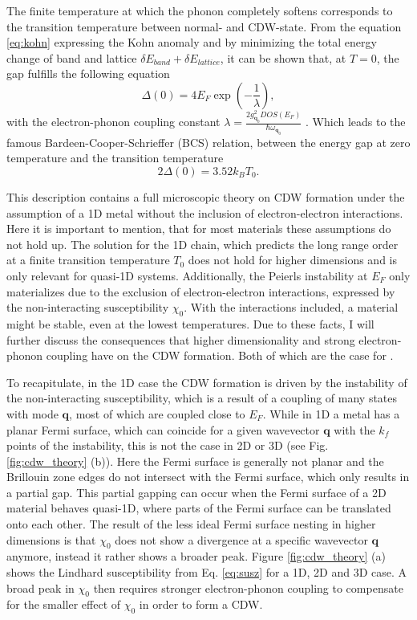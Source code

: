 The finite temperature at which the phonon completely softens corresponds to the transition temperature between normal- and CDW-state.
From the equation \ref{eq:kohn} expressing the Kohn anomaly and by minimizing the total energy change of band and lattice $\delta E_{band}+\delta E_{lattice}$, it can be shown that, at $T=0$, the gap fulfills the following equation
\begin{equation}
	\Delta(0)=4E_F\exp(-\frac{1}{\lambda}),
\end{equation}
with the electron-phonon coupling constant $\lambda=\frac{2g_{\mathbf{q}_0}^2DOS(E_F)}{\hbar\omega_{\mathbf{q}_0}}$ \cite{rice_theory_1973}. 
Which leads to the famous Bardeen-Cooper-Schrieffer (BCS) relation, between the energy gap at zero temperature and the transition temperature
\begin{equation}
	2\Delta(0)=3.52k_BT_0.
\end{equation}

This description contains a full microscopic theory on CDW formation under the assumption of a 1D metal without the inclusion of electron-electron interactions.
Here it is important to mention, that for most materials these assumptions do not hold up.
The solution for the 1D chain, which predicts the long range order at a finite transition temperature $T_0$ does not hold for higher dimensions and is only relevant for quasi-1D systems.
Additionally, the Peierls instability at $E_F$ only materializes due to the exclusion of electron-electron interactions, expressed by the non-interacting susceptibility $\chi_0$.
With the interactions included, a material might be stable, even at the lowest temperatures.
Due to these facts, I will further discuss the consequences that higher dimensionality and strong electron-phonon coupling have on the CDW formation.
Both of which are the case for .

To recapitulate, in the 1D case the CDW formation is driven by the instability of the non-interacting susceptibility, which is a result of a coupling of many states with mode $\mathbf{q}$, most of which are coupled close to $E_F$.
While in 1D a metal has a planar Fermi surface, which can coincide for a given wavevector $\mathbf{q}$ with the $k_f$ points of the instability, this is not the case in 2D or 3D (see Fig. \ref{fig:cdw_theory} (b)).
Here the Fermi surface is generally not planar and the Brillouin zone edges do not intersect with the Fermi surface, which only results in a partial gap.
This partial gapping can occur when the Fermi surface of a 2D material behaves quasi-1D, where parts of the Fermi surface can be translated onto each other.
The result of the less ideal Fermi surface nesting in higher dimensions is that $\chi_0$ does not show a divergence at a specific wavevector $\mathbf{q}$ anymore, instead it rather shows a broader peak.
Figure \ref{fig:cdw_theory} (a) shows the Lindhard susceptibility from Eq. \ref{eq:susz} for a 1D, 2D and 3D case.
A broad peak in $\chi_0$ then requires stronger electron-phonon coupling to compensate for the smaller effect of $\chi_0$ in order to form a CDW.

